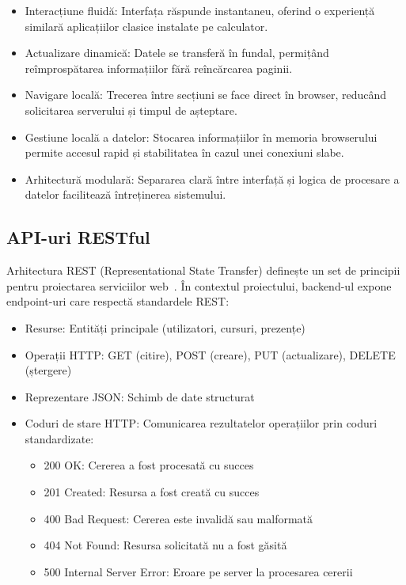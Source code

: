 \documentclass[conference]{IEEEtran}
\begin{document}
\begin{itemize}
    \item Interacțiune fluidă: Interfața răspunde instantaneu, oferind o experiență
          similară aplicațiilor clasice instalate pe calculator.
    \item Actualizare dinamică: Datele se transferă în fundal, permițând reîmprospătarea
          informațiilor fără reîncărcarea paginii.
    \item Navigare locală: Trecerea între secțiuni se face direct în browser, reducând
          solicitarea serverului și timpul de așteptare.
    \item Gestiune locală a datelor: Stocarea informațiilor în memoria browserului
          permite accesul rapid și stabilitatea în cazul unei conexiuni slabe.
    \item Arhitectură modulară: Separarea clară între interfață și logica de procesare a
          datelor facilitează întreținerea sistemului.
\end{itemize}

\subsection{API-uri RESTful}

Arhitectura REST (Representational State Transfer) definește un set de
principii pentru proiectarea serviciilor web~\cite{AWSRESTful2024}. În
contextul proiectului, backend-ul expone endpoint-uri care respectă standardele
REST:

\begin{itemize}
    \item Resurse: Entități principale (utilizatori, cursuri, prezențe)
    \item Operații HTTP: GET (citire), POST (creare), PUT (actualizare), DELETE
          (ștergere)
    \item Reprezentare JSON: Schimb de date structurat
    \item Coduri de stare HTTP: Comunicarea rezultatelor operațiilor prin coduri
          standardizate:
          \begin{itemize}
              \item 200 OK: Cererea a fost procesată cu succes
              \item 201 Created: Resursa a fost creată cu succes
              \item 400 Bad Request: Cererea este invalidă sau malformată
              \item 404 Not Found: Resursa solicitată nu a fost găsită
              \item 500 Internal Server Error: Eroare pe server la procesarea cererii
          \end{itemize}
\end{itemize}
\end{document}
